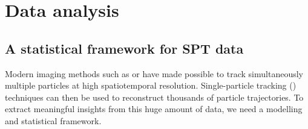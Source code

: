 
\chapter{Data analysis}\label{sec:data_analysis}


\section{A statistical framework for SPT data}

Modern imaging methods such as  or  have made possible to track simultaneously multiple particles at high spatiotemporal resolution. Single-particle tracking () techniques can then be used to reconstruct thousands of particle trajectories. To extract meaningful insights from this huge amount of data, we need a modelling and statistical framework.

